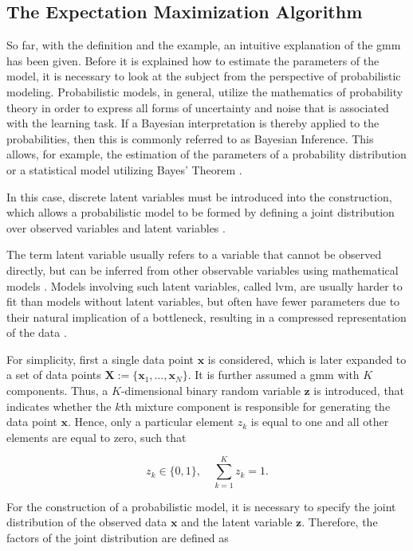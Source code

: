 \documentclass[../../../main.tex]{subfiles}
\begin{document}
\subsection{The Expectation Maximization Algorithm} \label{subsec:em_algorithm}
So far, with the definition and the example, an intuitive explanation of the \acrshort{gmm} has been given. Before it is explained how to estimate the parameters of the model, it is necessary to look at the subject from the perspective of probabilistic modeling. Probabilistic models, in general, utilize the mathematics of probability theory in order to express all forms of uncertainty and noise that is associated with the learning task. If a Bayesian interpretation is thereby applied to the probabilities, then this is commonly referred to as Bayesian Inference. This allows, for example, the estimation of the parameters of a probability distribution or a statistical model utilizing Bayes' Theorem \cite[p.245]{dei_2020}. 

In this case, discrete latent variables must be introduced into the construction, which allows a probabilistic model to be formed by defining a joint distribution over observed variables and latent variables \cite[432]{bis_2006}. 

The term latent variable usually refers to a variable that cannot be observed directly, but can be inferred from other observable variables using mathematical models \cite{bor_2003}. Models involving such latent variables, called \acrshort{lvm}, are usually harder to fit than models without latent variables, but often have fewer parameters due to their natural implication of a bottleneck, resulting in a compressed representation of the data \cite[337]{mur_2012}. 

For simplicity, first a single data point $\bm{x}$ is considered, which is later expanded to a set of data points $\bm{X}:=\{\bm{x}_1, \dots, \bm{x}_N\}$. It is further assumed a \acrshort{gmm} with $K$ components. Thus, a $K$-dimensional binary random variable $\bm{z}$ is introduced, that indicates whether the $k$th mixture component is responsible for generating the data point $\bm{x}$. Hence, only a particular element $z_k$ is equal to one and all other elements are equal to zero, such that

\begin{equation}
    z_k \in \{0,1\}, \quad \sum\limits^K_{k=1} z_k=1.
\end{equation}

For the construction of a probabilistic model, it is necessary to specify the joint distribution of the observed data $\bm{x}$ and the latent variable $\bm{z}$. Therefore, the factors of the joint distribution are defined as
\end{document}
